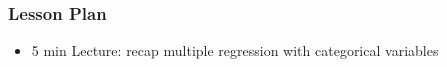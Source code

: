 \begin{frame}
    \frametitle{Lesson Plan}
    \begin{itemize}
        \item 5 min Lecture: recap multiple regression with categorical variables
     \end{itemize}
\end{frame}

    
